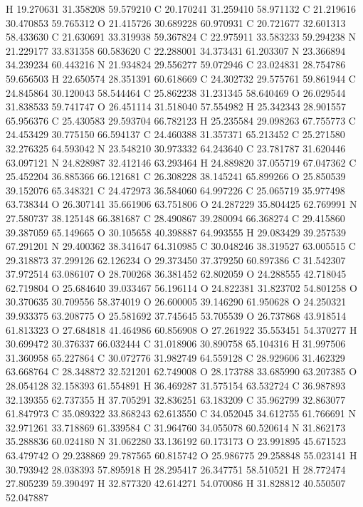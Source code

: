 \documentclass{article}
\begin{document}
H 19.270631 31.358208 59.579210
C 20.170241 31.259410 58.971132
C 21.219616 30.470853 59.765312
O 21.415726 30.689228 60.970931
C 20.721677 32.601313 58.433630
C 21.630691 33.319938 59.367824
C 22.975911 33.583233 59.294238
N 21.229177 33.831358 60.583620
C 22.288001 34.373431 61.203307
N 23.366894 34.239234 60.443216
N 21.934824 29.556277 59.072946
C 23.024831 28.754786 59.656503
H 22.650574 28.351391 60.618669
C 24.302732 29.575761 59.861944
C 24.845864 30.120043 58.544464
C 25.862238 31.231345 58.640469
O 26.029544 31.838533 59.741747
O 26.451114 31.518040 57.554982
H 25.342343 28.901557 65.956376
C 25.430583 29.593704 66.782123
H 25.235584 29.098263 67.755773
C 24.453429 30.775150 66.594137
C 24.460388 31.357371 65.213452
C 25.271580 32.276325 64.593042
N 23.548210 30.973332 64.243640
C 23.781787 31.620446 63.097121
N 24.828987 32.412146 63.293464
H 24.889820 37.055719 67.047362
C 25.452204 36.885366 66.121681
C 26.308228 38.145241 65.899266
O 25.850539 39.152076 65.348321
C 24.472973 36.584060 64.997226
C 25.065719 35.977498 63.738344
O 26.307141 35.661906 63.751806
O 24.287229 35.804425 62.769991
N 27.580737 38.125148 66.381687
C 28.490867 39.280094 66.368274
C 29.415860 39.387059 65.149665
O 30.105658 40.398887 64.993555
H 29.083429 39.257539 67.291201
N 29.400362 38.341647 64.310985
C 30.048246 38.319527 63.005515
C 29.318873 37.299126 62.126234
O 29.373450 37.379250 60.897386
C 31.542307 37.972514 63.086107
O 28.700268 36.381452 62.802059
O 24.288555 42.718045 62.719804
O 25.684640 39.033467 56.196114
O 24.822381 31.823702 54.801258
O 30.370635 30.709556 58.374019
O 26.600005 39.146290 61.950628
O 24.250321 39.933375 63.208775
O 25.581692 37.745645 53.705539
O 26.737868 43.918514 61.813323
O 27.684818 41.464986 60.856908
O 27.261922 35.553451 54.370277
H 30.699472 30.376337 66.032444
C 31.018906 30.890758 65.104316
H 31.997506 31.360958 65.227864
C 30.072776 31.982749 64.559128
C 28.929606 31.462329 63.668764
C 28.348872 32.521201 62.749008
O 28.173788 33.685990 63.207385
O 28.054128 32.158393 61.554891
H 36.469287 31.575154 63.532724
C 36.987893 32.139355 62.737355
H 37.705291 32.836251 63.183209
C 35.962799 32.863077 61.847973
C 35.089322 33.868243 62.613550
C 34.052045 34.612755 61.766691
N 32.971261 33.718869 61.339584
C 31.964760 34.055078 60.520614
N 31.862173 35.288836 60.024180
N 31.062280 33.136192 60.173173
O 23.991895 45.671523 63.479742
O 29.238869 29.787565 60.815742
O 25.986775 29.258848 55.023141
H 30.793942 28.038393 57.895918
H 28.295417 26.347751 58.510521
H 28.772474 27.805239 59.390497
H 32.877320 42.614271 54.070086
H 31.828812 40.550507 52.047887
\end{document}
